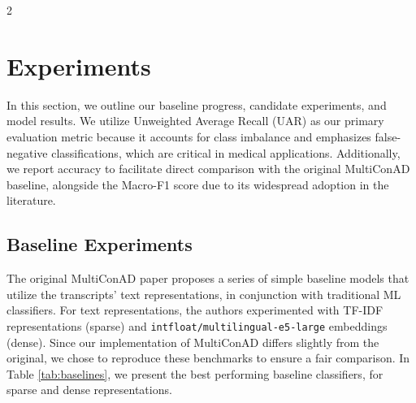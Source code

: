 \documentclass[10pt]{article}
\begin{document}
\begin{multicols}{2}
\section{Experiments}
\par In this section, we outline our baseline progress, candidate experiments,
and model results. We utilize Unweighted Average Recall (UAR) as our primary
evaluation metric because it accounts for class imbalance and emphasizes
false-negative classifications, which are critical in medical applications.
Additionally, we report accuracy to facilitate direct comparison with the
original MultiConAD baseline, alongside the Macro-F1 score due to its
widespread adoption in the literature.
\subsection{Baseline Experiments}
The original MultiConAD paper proposes a series of simple baseline models that
utilize the transcripts' text representations, in conjunction with traditional
ML classifiers. For text representations, the authors experimented with TF-IDF
representations (sparse) and \texttt{intfloat/multilingual-e5-large}
embeddings (dense). Since our implementation of MultiConAD differs slightly
from the original, we chose to reproduce these benchmarks to ensure a fair
comparison. In Table \ref{tab:baselines}, we present the best performing
baseline classifiers, for sparse and dense representations.


\end{multicols}
\end{document}
